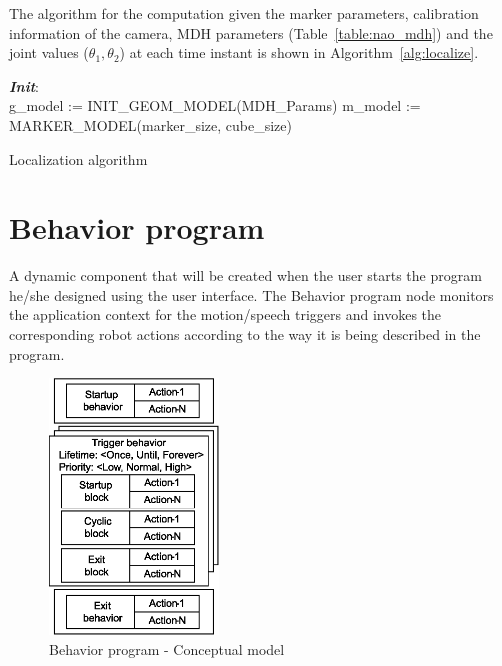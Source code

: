 The algorithm for the computation given the marker parameters, calibration information of the camera, MDH parameters (Table~\ref{table:nao_mdh}) and the joint values ($\theta_1,\theta_2$) at each time instant is shown in Algorithm~\ref{alg:localize}.

\begin{algorithm}[H]
 \textbf{\emph{Init}}:\\
 \quad g\_model := INIT\_GEOM\_MODEL(MDH\_Params)\;
 \quad m\_model := MARKER\_MODEL(marker\_size, cube\_size)\;
 \caption{Localization algorithm}
 \label{alg:localize}
\end{algorithm}
\section{Behavior program} 
\label{ssec:behavior_program}
A dynamic component that will be created when the user starts the program he/she designed using the user interface. The Behavior program node monitors the application context for the motion/speech triggers and invokes the corresponding robot actions according to the way it is being described in the program.
\begin{figure}
\centering
\includegraphics[width=0.4\textwidth]{../thesis/assets/program_structure.eps}
\caption[Behavior program - Conceptual model]{Behavior program - Conceptual model}
\label{fig:program_concept}
\end{figure}
